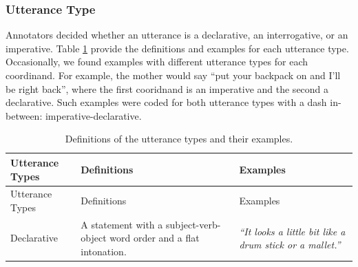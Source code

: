 \documentclass[oneside]{report}
\theoremstyle{definition}
\theoremstyle{definition}
\theoremstyle{definition}
\theoremstyle{remark}
\begin{document}
\subsubsection{Utterance Type}\label{utterance-type}

Annotators decided whether an utterance is a declarative, an
interrogative, or an imperative. Table \ref{tab:utteranceTypes} provide
the definitions and examples for each utterance type. Occasionally, we
found examples with different utterance types for each coordinand. For
example, the mother would say ``put your backpack on and I'll be right
back'', where the first cooridnand is an imperative and the second a
declarative. Such examples were coded for both utterance types with a
dash in-between: imperative-declarative.
\begin{longtable}[]{@{}lll@{}}
\caption{\label{tab:utteranceTypes} Definitions of the utterance types and
their examples.}\tabularnewline
\toprule
\begin{minipage}[b]{0.18\columnwidth}\raggedright\strut
Utterance Types\strut
\end{minipage} & \begin{minipage}[b]{0.42\columnwidth}\raggedright\strut
Definitions\strut
\end{minipage} & \begin{minipage}[b]{0.32\columnwidth}\raggedright\strut
Examples\strut
\end{minipage}\tabularnewline
\midrule
\endfirsthead
\toprule
\begin{minipage}[b]{0.18\columnwidth}\raggedright\strut
Utterance Types\strut
\end{minipage} & \begin{minipage}[b]{0.42\columnwidth}\raggedright\strut
Definitions\strut
\end{minipage} & \begin{minipage}[b]{0.32\columnwidth}\raggedright\strut
Examples\strut
\end{minipage}\tabularnewline
\midrule
\endhead
\begin{minipage}[t]{0.18\columnwidth}\raggedright\strut
Declarative\strut
\end{minipage} & \begin{minipage}[t]{0.42\columnwidth}\raggedright\strut
A statement with a subject-verb-object word order and a flat
intonation.\strut
\end{minipage} & \begin{minipage}[t]{0.32\columnwidth}\raggedright\strut
\emph{``It looks a little bit like a drum stick or a mallet.''}\strut

\end{minipage}
\end{longtable}
\end{document}
